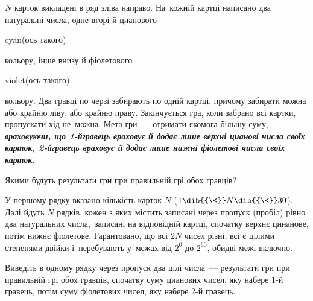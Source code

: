
$N$ карток викладені в ряд зліва направо. На~кожній картці написано два натуральні числа, одне вгорі й цианового \begin{color}{cyan}(ось такого)\end{color} кольору, інше внизу й фіолетового \begin{color}{violet}(ось такого)\end{color} кольору. Два гравці по черзі забирають по одній картці, причому забирати можна або крайню ліву, або крайню праву. Закінчується гра, коли забрано всі картки, пропускати хід не~можна. Мета гри~--- отримати якомога більшу суму,
\textbf{\emph{враховуючи, що \mbox{1-й}\nolinebreak[3] гравець враховує й додає лише верхні цианові числа своїх карток, \mbox{2-й}\nolinebreak[3] гравець враховує й додає лише нижні фіолетові числа своїх карток}}.

Якими будуть результати гри при правильній грі обох гравців?

\InputFile
У першому рядку вказано кількість карток $N$ ($1\dib{{\<}}N\dib{{\<}}30$). Далі йдуть $N$ рядків, кожен з яких містить записані через пропуск (пробіл) рівно два натуральних числа, записані на відповідній картці, спочатку верхнє цинанове, потім нижнє фіолетове. Гарантовано, що всі $2N$ чисел різні, всі є цілими степенями двійки і~перебувають у~межах від $2^0$ до $2^{60}$, обидві межі включно.


\OutputFile
Виведіть в одному рядку через пропуск два цілі числа~--- результати гри при правильній грі обох гравців, спочатку суму цианових чисел, яку набере \mbox{1-й} гравець, потім суму фіолетових чисел, яку набере \mbox{2-й} гравець.

\Examples
\begin{exampleSimple}{5em}{6.5em}
%
%
%
\end{exampleSimple}


